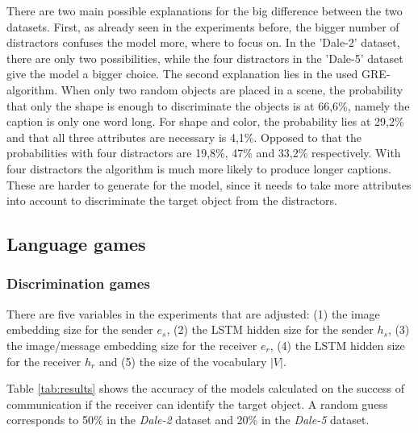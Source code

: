 There are two main possible explanations for the big difference between the two datasets.
First, as already seen in the experiments before, the bigger number of distractors confuses the model more, where to focus on.
In the 'Dale-2' dataset, there are only two possibilities, while the four distractors in the 'Dale-5' dataset give the model a bigger choice.
The second explanation lies in the used GRE-algorithm.
When only two random objects are placed in a scene, the probability that only the shape is enough to discriminate the objects is at 66,6\%, namely the caption is only one word long.
For shape and color, the probability lies at 29,2\% and that all three attributes are necessary is 4,1\%.
Opposed to that the probabilities with four distractors are 19,8\%, 47\% and 33,2\% respectively.
With four distractors the algorithm is much more likely to produce longer captions.
These are harder to generate for the model, since it needs to take more attributes into account to discriminate the target object from the distractors.

\subsection{Language games}
\subsubsection{Discrimination games}
There are five variables in the experiments that are adjusted:
(1) the image embedding size for the sender $e_s$, (2) the LSTM hidden size for the sender $h_s$, (3) the image/message embedding size for the receiver $e_r$, (4) the LSTM hidden size for the receiver $h_r$ and (5) the size of the vocabulary $|V|$.

Table \ref{tab:results} shows the accuracy of the models calculated on the success of communication if the receiver can identify the target object.
A random guess corresponds to 50\% in the \emph{Dale-2} dataset and 20\% in the \emph{Dale-5} dataset.

